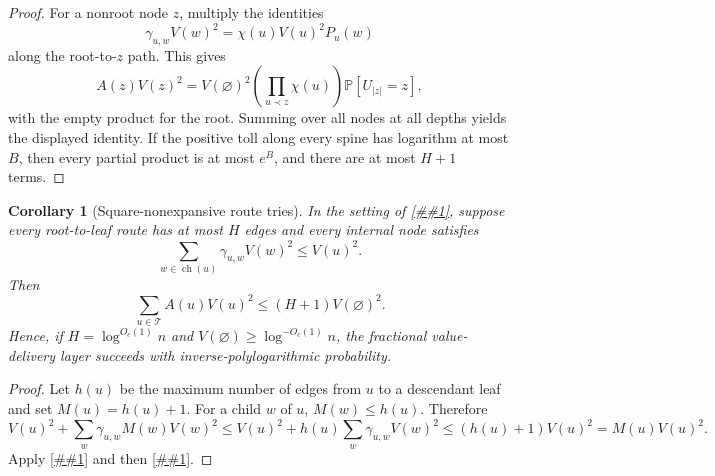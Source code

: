 \documentclass[10pt]{article}
\newcommand{\cref}[1]{\ref{##1}}
\newtheorem{corollary}[theorem]{Corollary}
\theoremstyle{definition}
\newcommand{\Prb}{\mathbb{P}}
\begin{document}
\begin{proof}
   For a nonroot node $z$, multiply the identities
   \[
      \gamma_{u,w}V(w)^2
      =
      \chi(u)V(u)^2P_u(w)
   \]
   along the root-to-$z$ path. This gives
   \[
      A(z)V(z)^2
      =
      V(\varnothing)^2
      \left(\prod_{u\prec z}\chi(u)\right)
      \Prb[U_{|z|}=z],
   \]
   with the empty product for the root. Summing over all nodes at all depths
   yields the displayed identity. If the positive toll along every spine has
   logarithm at most $B$, then every partial product is at most $e^B$, and
   there are at most $H+1$ terms.
\end{proof}

\begin{corollary}[Square-nonexpansive route tries]\label{cor:square-nonexpansive-routes}
   In the setting of \cref{lem:lca-value-flow}, suppose every root-to-leaf route
   has at most $H$ edges and every internal node satisfies
   \[
      \sum_{w\in\operatorname{ch}(u)}
      \gamma_{u,w}V(w)^2
      \le
      V(u)^2 .
   \]
   Then
   \[
      \sum_{u\in\mathcal T}A(u)V(u)^2
      \le
      (H+1)V(\varnothing)^2 .
   \]
   Hence, if $H=\log^{O_c(1)}n$ and
   $V(\varnothing)\ge\log^{-O_c(1)}n$, the fractional value-delivery layer
   succeeds with inverse-polylogarithmic probability.
\end{corollary}

\begin{proof}
   Let $h(u)$ be the maximum number of edges from $u$ to a descendant leaf and
   set $M(u)=h(u)+1$. For a child $w$ of $u$, $M(w)\le h(u)$. Therefore
   \[
      V(u)^2+
      \sum_w\gamma_{u,w}M(w)V(w)^2
      \le
      V(u)^2+h(u)\sum_w\gamma_{u,w}V(w)^2
      \le
      (h(u)+1)V(u)^2
      =
      M(u)V(u)^2 .
   \]
   Apply \cref{lem:local-lca-energy} and then
   \cref{lem:lca-value-flow}.
\end{proof}
\end{document}
